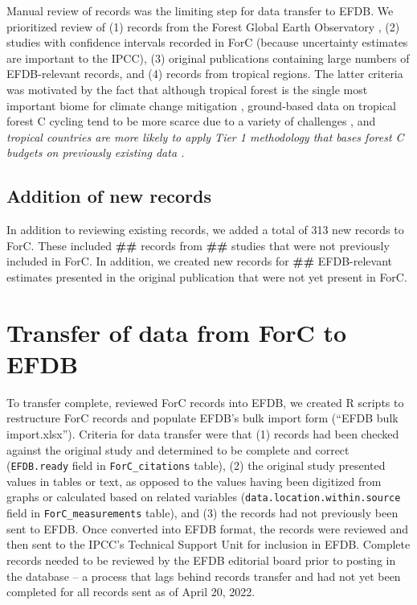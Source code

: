 \documentclass[, manuscript]{copernicus}
\begin{document}
Manual review of records was the limiting step for data transfer to
EFDB. We prioritized review of (1) records from the Forest Global Earth
Observatory
\citep[ForestGEO,][]{anderson-teixeira_ctfsforestgeo_2015, davies_forestgeo_2021},
(2) studies with confidence intervals recorded in ForC (because
uncertainty estimates are important to the IPCC), (3) original
publications containing large numbers of EFDB-relevant records, and (4)
records from tropical regions. The latter criteria was motivated by the
fact that although tropical forest is the single most important biome
for climate change mitigation \citep{refs}, ground-based data on
tropical forest C cycling tend to be more scarce due to a variety of
challenges \citep{delima_making_2022}, and \emph{tropical countries are
more likely to apply Tier 1 methodology that bases forest C budgets on
previously existing data \citep{ref}.}

\subsection{Addition of new records}

In addition to reviewing existing records, we added a total of 313 new
records to ForC. These included \textbf{\#\#} records from \textbf{\#\#}
studies \citep{piponiot_distribution_2022, refs} that were not
previously included in ForC. In addition, we created new records for
\textbf{\#\#} EFDB-relevant estimates presented in the original
publication that were not yet present in ForC.

\section{Transfer of data from ForC to EFDB}

To transfer complete, reviewed ForC records into EFDB, we created R
scripts to restructure ForC records and populate EFDB's bulk import form
(``EFDB bulk import.xlsx''). Criteria for data transfer were that (1)
records had been checked against the original study and determined to be
complete and correct (\texttt{EFDB.ready} field in
\texttt{ForC\_citations} table), (2) the original study presented values
in tables or text, as opposed to the values having been digitized from
graphs or calculated based on related variables
(\texttt{data.location.within.source} field in
\texttt{ForC\_measurements} table), and (3) the records had not
previously been sent to EFDB. Once converted into EFDB format, the
records were reviewed and then sent to the IPCC's Technical Support Unit
for inclusion in EFDB. Complete records needed to be reviewed by the
EFDB editorial board prior to posting in the database -- a process that
lags behind records transfer and had not yet been completed for all
records sent as of April 20, 2022.
\end{document}
